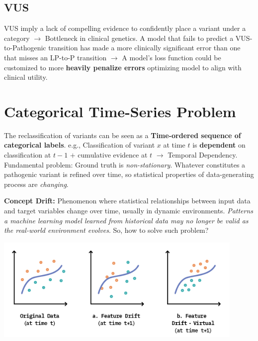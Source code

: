 \documentclass[../main.tex]{subfiles}
\begin{document}
\subsection{VUS}

VUS imply a lack of compelling evidence to confidently place a variant under a category $\rightarrow$ Bottleneck in clinical genetics. A model that fails to predict a VUS-to-Pathogenic transition has made a more clinically significant error than one that misses an LP-to-P transition $\rightarrow$ A model's loss function could be customized to more \textbf{heavily penalize errors} optimizing model to align with clinical utility.

\section{Categorical Time-Series Problem}

The reclassification of variants can be seen as a \textbf{Time-ordered sequence of categorical labels}. e.g., Classification of variant $x$ at time $t$ is \textbf{dependent} on classification at $t-1$ $+$ cumulative evidence at $t$ $\rightarrow$ Temporal Dependency. Fundamental problem: Ground truth is \textit{non-stationary}. Whatever constitutes a pathogenic variant is refined over time, so statistical properties of data-generating process are \textit{changing}.

\vspace{0.2cm}

\textbf{Concept Drift:} Phenomenon where statistical relationships between input data and target variables change over time, usually in dynamic environments.
\textit{Patterns a machine learning model learned from historical data may no longer be valid as the real-world environment evolves}. So, how to solve such problem?

\begin{center}
    \includegraphics[width=12cm]{files/images/drift.png}    
\end{center}
\end{document}
